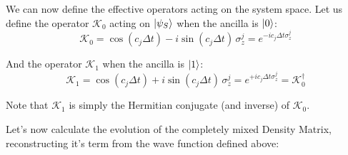 \documentclass[a4paper,12pt]{article}
\begin{document}
	We can now define the effective operators acting on the system space. Let us define the operator $\mathcal{K}_0$ acting on $\ket{\psi_S}$ when the ancilla is $\ket{0}$:
	\begin{equation}
		\mathcal{K}_0 = \cos{\left( c_j \Delta t \right)} - i \sin{\left( c_j \Delta t \right)} \, \sigma_{z}^{j} = e^{-i c_j \Delta t \sigma_z^j}
	\end{equation}
	
	And the operator $\mathcal{K}_1$ when the ancilla is $\ket{1}$:
	\begin{equation}
		\mathcal{K}_1 = \cos{\left( c_j \Delta t \right)} + i \sin{\left( c_j \Delta t \right)} \, \sigma_{z}^{j} = e^{+i c_j \Delta t \sigma_z^j} = \mathcal{K}_0^\dagger
	\end{equation}
	
	Note that $\mathcal{K}_1$ is simply the Hermitian conjugate (and inverse) of $\mathcal{K}_0$. 
	
		Let's now calculate the evolution of the completely mixed Density Matrix, reconstructing it's term from the wave function defined above:
\end{document}
